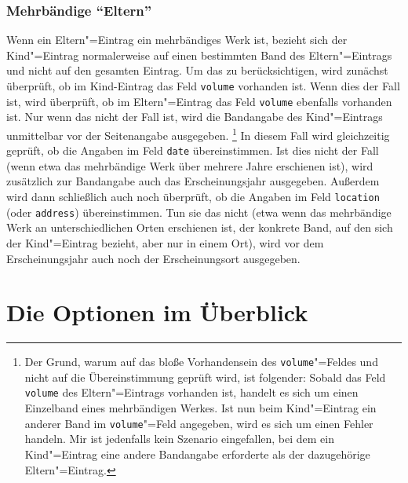 \documentclass[ngerman]{scrartcl}
\begin{document}
\subsubsection{Mehrbändige \enquote{Eltern}}
Wenn ein Eltern"=Eintrag ein mehrbändiges Werk ist, bezieht sich der 
Kind"=Eintrag normalerweise auf einen bestimmten Band des Eltern"=Eintrags und
nicht auf den gesamten Eintrag. Um das zu berücksichtigen, wird zunächst
überprüft, ob im Kind-Eintrag das Feld \texttt{volume} vorhanden ist. Wenn dies
der Fall ist, wird überprüft, ob im Eltern"=Eintrag das Feld \texttt{volume}
ebenfalls vorhanden ist. Nur wenn das nicht der Fall ist, wird die Bandangabe
des Kind"=Eintrags unmittelbar vor der Seitenangabe ausgegeben.%
\footnote{Der Grund, warum auf das bloße Vorhandensein
des \texttt{volume}"=Feldes und nicht auf die Übereinstimmung geprüft wird, ist folgender:
Sobald das Feld \texttt{volume} des Eltern"=Eintrags vorhanden ist, handelt es sich
um einen Einzelband eines mehrbändigen Werkes. Ist nun beim Kind"=Eintrag ein anderer
Band im \texttt{volume}"=Feld angegeben, wird es sich um einen Fehler handeln. Mir ist
jedenfalls kein Szenario eingefallen, bei dem ein Kind"=Eintrag eine andere Bandangabe
erforderte als der dazugehörige Eltern"=Eintrag.} In diesem Fall wird gleichzeitig 
geprüft, ob die Angaben im Feld \texttt{date} übereinstimmen. Ist dies nicht der Fall
(wenn etwa das mehrbändige Werk über mehrere Jahre erschienen ist), wird zusätzlich
zur Bandangabe auch das Erscheinungsjahr ausgegeben. Außerdem wird dann schließlich
auch noch überprüft, ob die Angaben im Feld \texttt{location} (oder \texttt{address})
übereinstimmen. Tun sie das nicht (etwa wenn das mehrbändige Werk an unterschiedlichen
Orten erschienen ist, der konkrete Band, auf den sich der Kind"=Eintrag bezieht, aber nur
in einem Ort), wird vor dem Erscheinungsjahr auch noch der Erscheinungsort ausgegeben.

\section{Die Optionen im Überblick}
\end{document}
